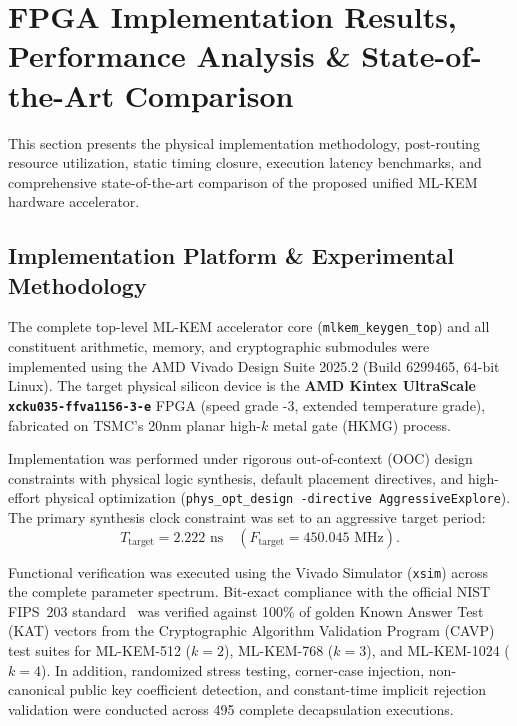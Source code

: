 \section{FPGA Implementation Results, Performance Analysis \& State-of-the-Art Comparison}
\label{sec:results}

This section presents the physical implementation methodology, post-routing resource utilization, static timing closure, execution latency benchmarks, and comprehensive state-of-the-art comparison of the proposed unified \mbox{ML-KEM} hardware accelerator.

\subsection{Implementation Platform \& Experimental Methodology}
\label{sec:results_platform}

The complete top-level \mbox{ML-KEM} accelerator core (\texttt{mlkem\_keygen\_top}) and all constituent arithmetic, memory, and cryptographic submodules were implemented using the AMD Vivado Design Suite 2025.2 (Build 6299465, 64-bit Linux). The target physical silicon device is the \textbf{AMD Kintex UltraScale \texttt{xcku035-ffva1156-3-e}} FPGA (speed grade -3, extended temperature grade), fabricated on TSMC's 20nm planar high-$k$ metal gate (HKMG) process.

Implementation was performed under rigorous out-of-context (OOC) design constraints with physical logic synthesis, default placement directives, and high-effort physical optimization (\texttt{phys\_opt\_design -directive AggressiveExplore}). The primary synthesis clock constraint was set to an aggressive target period:
\begin{equation}
\label{eq:clock_constraint}
T_{\text{target}} = 2.222\text{ ns} \quad (F_{\text{target}} = 450.045\text{ MHz}).
\end{equation}

Functional verification was executed using the Vivado Simulator (\texttt{xsim}) across the complete parameter spectrum. Bit-exact compliance with the official NIST FIPS~203 standard~\cite{fips203} was verified against 100\% of golden Known Answer Test (KAT) vectors from the Cryptographic Algorithm Validation Program (CAVP) test suites for ML-KEM-512 ($k = 2$), ML-KEM-768 ($k = 3$), and ML-KEM-1024 ($k = 4$). In addition, randomized stress testing, corner-case injection, non-canonical public key coefficient detection, and constant-time implicit rejection validation were conducted across 495 complete decapsulation executions.

